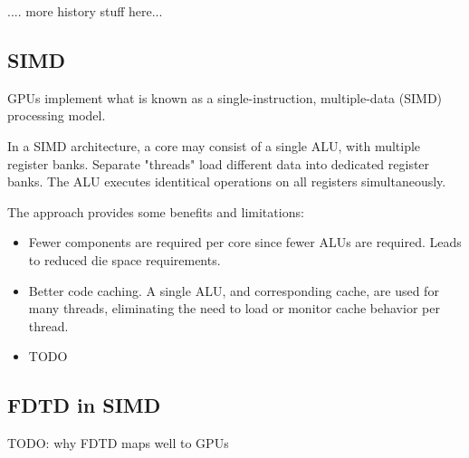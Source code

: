 .... more history stuff here...


\subsection{SIMD}\label{sec:simd}

GPUs implement what is known as a single-instruction, multiple-data (SIMD)\cite{techpattichis2003} processing model.

In a SIMD architecture, a core may consist of a single ALU, with multiple register banks. Separate "threads" load different data into dedicated register banks. The ALU executes identitical operations on all registers simultaneously.

The approach provides some benefits and limitations:

\begin{itemize}
	\item Fewer components are required per core since fewer ALUs are required. Leads to reduced die space requirements.
	\item Better code caching. A single ALU, and corresponding cache, are used for many threads, eliminating the need to load or monitor cache behavior per thread.
	\item TODO
\end{itemize}


\subsection{FDTD in SIMD}

TODO: why FDTD maps well to GPUs



